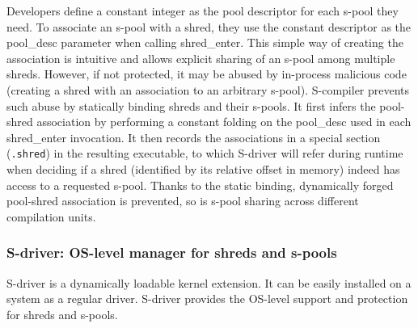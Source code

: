 Developers define a constant integer as the pool descriptor for each s-pool they need. 
To associate an s-pool with a shred, they use the constant descriptor as the {\itt pool\_desc} parameter when calling {\btt shred\_enter}. This simple way of creating the association is intuitive and allows explicit sharing of an s-pool among multiple shreds. 
However, if not protected, it may be abused by in-process malicious code (\eg creating a shred with an association to an arbitrary s-pool). 
S-compiler prevents such abuse by statically binding shreds and their s-pools. 
It first infers the pool-shred association by performing a constant folding on the {\itt pool\_desc} used in each {\btt shred\_enter} invocation. It then records the associations in a special section ({\tt .shred}) in the resulting executable, to which S-driver will refer during runtime when deciding if a shred (identified by its relative offset in memory) indeed has access to a requested s-pool. Thanks to the static binding, dynamically forged pool-shred association is prevented, so is s-pool sharing across different compilation units. 

\subsubsection{S-driver: OS-level manager for shreds and s-pools}
S-driver is a dynamically loadable kernel extension. It can be easily installed on a system as a regular driver. 
S-driver provides the OS-level support and protection for shreds and s-pools. 

